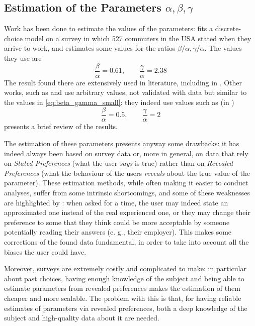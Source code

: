 \subsection{Estimation of the Parameters $\alpha, \beta, \gamma$}

Work has been done to estimate the values of the parameters:
\textcite{54d203ee-4bf8-3234-9286-56e4c8b7f5bd} fits a discrete-choice model on a survey in which 527 commuters in the USA stated when they arrive to work, and estimates some values for the ratios \(\beta/\alpha, \gamma/\alpha\).
The values they use are
\begin{equation}
  \label{eq:beta_gamma_small}
  \frac{\beta}{\alpha} = 0.61,\qquad \frac{\gamma}{\alpha} = 2.38
\end{equation}
The result found there are extensively used in literature, including in \textcite{d0907f84-e14a-3d98-ad20-759f41491d6e}.
Other works, such as \textcite{doi:10.3141/1807-04} and \textcite{4ffb5da1-1f49-3898-98a7-209781744dc0} use arbitrary values,
not validated with data but similar to the values in \eqref{eq:beta_gamma_small}:
they indeed use values such as (in \cite{4ffb5da1-1f49-3898-98a7-209781744dc0})
\begin{equation}
  \label{eq:beta_gamma_vickrey}
  \frac{\beta}{\alpha} = 0.5,\qquad \frac{\gamma}{\alpha} = 2
\end{equation}
\textcite{https://doi.org/10.1111/iere.12692} presents a brief review of the results.

The estimation of these parameters presents anyway some drawbacks:
it has indeed always been based on survey data or,
more in general, on data that rely on \textit{Stated Preferences} (what the user \textit{says} is true)
rather than on \textit{Revealed Preferences} (what the behaviour of the users \textit{reveals} about the true value of the parameter).
These estimation methods, while often making it easier to conduct analyses,
suffer from some intrinsic shortcomings,
and some of these weaknesses are highlighted by \textcite{54d203ee-4bf8-3234-9286-56e4c8b7f5bd}:
when asked for a time, the user may indeed state an approximated one instead of the real experienced one,
or they may change their preference to some that they think could be more acceptable by someone potentially reading their answers (e. g., their employer).
This makes some corrections of the found data fundamental,
in order to take into account all the biases the user could have.

Moreover, surveys are extremely costly and complicated to make:
in particular about past choices, having enough knowledge of the subject
and being able to estimate parameters from revealed preferences
makes the estimation of them cheaper and more scalable.
The problem with this is that,
for having reliable estimates of parameters via revealed preferences,
both a deep knowledge of the subject and high-quality data about it are needed.

